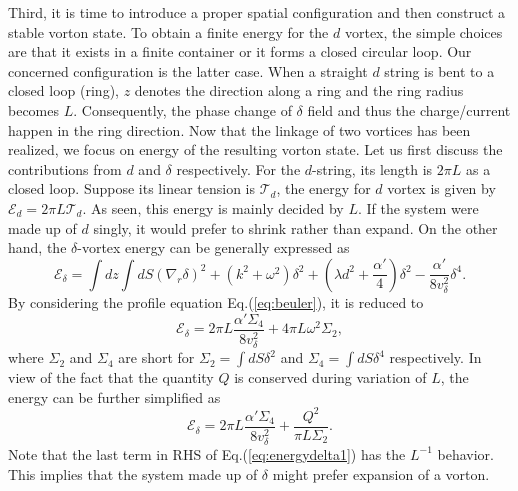 \documentclass[12pt]{article}
\begin{document}
Third, it is time to introduce a proper spatial configuration and then
construct a stable vorton state.
To obtain a finite energy for the $d$ vortex, the simple choices are that it exists in a finite
container or it forms a closed circular loop.
Our concerned configuration is the latter case. When a straight $d$ string is bent to a
closed loop (ring), $z$ denotes the direction along a ring and the ring radius becomes $L$.
Consequently, the phase change of $\delta$ field and thus the charge/current happen in
the ring direction.
Now that the linkage of two vortices has been realized, we focus on energy of the resulting vorton state.
Let us first discuss the contributions from $d$ and
$\delta$ respectively. For the $d$-string, its length is $2 \pi L$ as a closed loop.
Suppose its linear tension is $\mathcal{T}_d$, the energy for $d$ vortex is given by
$\mathcal{E}_d = 2\pi L \mathcal{T}_d$. As seen, this energy is mainly decided by $L$.
If the system were made up of $d$ singly, it would prefer to shrink
rather than expand.
On the other hand, the $\delta$-vortex energy can be generally expressed as
\begin{equation}
  \label{eq:deltah}
  \mathcal{E}_\delta = \int dz \int dS  (\nabla_r \delta)^2 + (k^2 + \omega^2)\delta^2 + (\lambda d^2 + \frac{\alpha'}{4})\delta^2 - \frac{\alpha'}{8v_\delta^2}\delta^4.
\end{equation}
By considering the profile equation Eq.(\ref{eq:beuler}), it is reduced to
\begin{equation}
  \label{eq:energydelta}
  \mathcal{E}_{\delta} =  2\pi L\frac{\alpha' \Sigma_4}{8v_\delta^2} + 4 \pi L \omega^2 \Sigma_2,
\end{equation}
where $\Sigma_2$ and $\Sigma_4$ are short for
$\Sigma_2 = \int dS \delta^2$ and $\Sigma_4 = \int dS \delta^4$ respectively.
In view of the fact that the quantity $Q$ is conserved during variation of $L$, the energy can be further simplified as
\begin{equation}
  \label{eq:energydelta1}
  \mathcal{E}_{\delta} =  2\pi L\frac{\alpha' \Sigma_4}{8v_\delta^2} + \frac{Q^2}{\pi L \Sigma_2}.
\end{equation}
Note that the last term in RHS of Eq.(\ref{eq:energydelta1}) has the
$L^{-1}$ behavior.
This implies that the system made up of $\delta$ might prefer expansion of a vorton.
\end{document}
